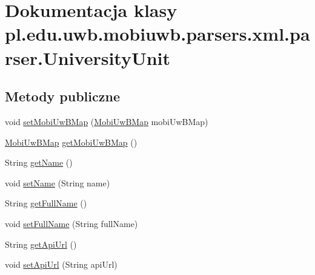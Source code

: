 \hypertarget{classpl_1_1edu_1_1uwb_1_1mobiuwb_1_1parsers_1_1xml_1_1parser_1_1_university_unit}{}\section{Dokumentacja klasy pl.\+edu.\+uwb.\+mobiuwb.\+parsers.\+xml.\+parser.\+University\+Unit}
\label{classpl_1_1edu_1_1uwb_1_1mobiuwb_1_1parsers_1_1xml_1_1parser_1_1_university_unit}
\subsection*{Metody publiczne}
\begin{DoxyCompactItemize}
\item 
void \hyperlink{classpl_1_1edu_1_1uwb_1_1mobiuwb_1_1parsers_1_1xml_1_1parser_1_1_university_unit_ae2a633d999c979fce8f70646b17f6440}{set\+Mobi\+Uw\+B\+Map} (\hyperlink{classpl_1_1edu_1_1uwb_1_1mobiuwb_1_1parsers_1_1xml_1_1parser_1_1_mobi_uw_b_map}{Mobi\+Uw\+B\+Map} mobi\+Uw\+B\+Map)
\item 
\hyperlink{classpl_1_1edu_1_1uwb_1_1mobiuwb_1_1parsers_1_1xml_1_1parser_1_1_mobi_uw_b_map}{Mobi\+Uw\+B\+Map} \hyperlink{classpl_1_1edu_1_1uwb_1_1mobiuwb_1_1parsers_1_1xml_1_1parser_1_1_university_unit_aec574e41a6284411342cac8835b235f1}{get\+Mobi\+Uw\+B\+Map} ()
\item 
String \hyperlink{classpl_1_1edu_1_1uwb_1_1mobiuwb_1_1parsers_1_1xml_1_1parser_1_1_university_unit_ab0516adcd3eeefe9a779fdef6307369a}{get\+Name} ()
\item 
void \hyperlink{classpl_1_1edu_1_1uwb_1_1mobiuwb_1_1parsers_1_1xml_1_1parser_1_1_university_unit_a08b3b07d289319b85fb870c48819c833}{set\+Name} (String name)
\item 
String \hyperlink{classpl_1_1edu_1_1uwb_1_1mobiuwb_1_1parsers_1_1xml_1_1parser_1_1_university_unit_a59f2a48f2ca3e07fcfd6e4b23d0f6718}{get\+Full\+Name} ()
\item 
void \hyperlink{classpl_1_1edu_1_1uwb_1_1mobiuwb_1_1parsers_1_1xml_1_1parser_1_1_university_unit_a29da8580612923a68d1d7f6df81f3d90}{set\+Full\+Name} (String full\+Name)
\item 
String \hyperlink{classpl_1_1edu_1_1uwb_1_1mobiuwb_1_1parsers_1_1xml_1_1parser_1_1_university_unit_a3022fd1c1338295501e79f71fe42a3b9}{get\+Api\+Url} ()
\item 
void \hyperlink{classpl_1_1edu_1_1uwb_1_1mobiuwb_1_1parsers_1_1xml_1_1parser_1_1_university_unit_ad636842cdb2d5562a6f45866dc97f01e}{set\+Api\+Url} (String api\+Url)

\end{DoxyCompactItemize}
